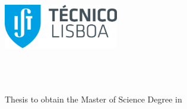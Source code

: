 
\begin{titlepage}
\includegraphics[width=5cm]{images/ist_logo}~\\
%
\if{}
  \vspace*{\finalLogoSpacing}
\else
  \vspace*{\draftLogoSpacing}
\fi

\begin{center}
{\LARGE \textbf{\Title}}\\[1.0cm]
{\Large \Subtitle}\\[1.0cm]
{\Large \textbf{\StudentName}}\\[1.0cm]
{\large Thesis to obtain the Master of Science Degree in}\\[1.0cm]
{\LARGE \textbf{\DegreeName}}\\[1.0cm]



\end{center}
\end{titlepage}

